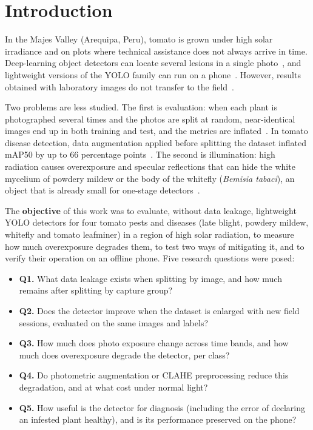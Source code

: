 \documentclass[sensors,article,submit,pdftex,moreauthors]{Definitions/mdpi}
\begin{document}
\section{Introduction}

In the Majes Valley (Arequipa, Peru), tomato is grown under high solar irradiance and on plots where technical assistance does not always arrive in time. Deep-learning object detectors can locate several lesions in a single photo~\cite{Fuentes2017}, and lightweight versions of the YOLO family can run on a phone~\cite{Zhong2024,Wang2025}. However, results obtained with laboratory images do not transfer to the field~\cite{Mohanty2016,Jelali2024}.

Two problems are less studied. The first is evaluation: when each plant is photographed several times and the photos are split at random, near-identical images end up in both training and test, and the metrics are inflated~\cite{Kapoor2023}. In tomato disease detection, data augmentation applied before splitting the dataset inflated mAP50 by up to 66 percentage points~\cite{Gerz2025}. The second is illumination: high radiation causes overexposure and specular reflections that can hide the white mycelium of powdery mildew or the body of the whitefly (\emph{Bemisia tabaci}), an object that is already small for one-stage detectors~\cite{Zhang2024Jute,Zhao2025}.

The \textbf{objective} of this work was to evaluate, without data leakage, lightweight YOLO detectors for four tomato pests and diseases (late blight, powdery mildew, whitefly and tomato leafminer) in a region of high solar radiation, to measure how much overexposure degrades them, to test two ways of mitigating it, and to verify their operation on an offline phone. Five research questions were posed:
\begin{itemize}[leftmargin=*,labelsep=4.9mm]
\item \textbf{Q1.} What data leakage exists when splitting by image, and how much remains after splitting by capture group?
\item \textbf{Q2.} Does the detector improve when the dataset is enlarged with new field sessions, evaluated on the same images and labels?
\item \textbf{Q3.} How much does photo exposure change across time bands, and how much does overexposure degrade the detector, per class?
\item \textbf{Q4.} Do photometric augmentation or CLAHE preprocessing reduce this degradation, and at what cost under normal light?
\item \textbf{Q5.} How useful is the detector for diagnosis (including the error of declaring an infested plant healthy), and is its performance preserved on the phone?
\end{itemize}
\end{document}
